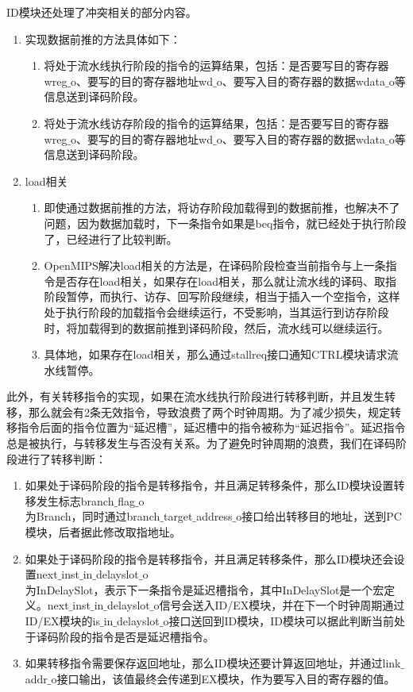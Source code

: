 ID模块还处理了冲突相关的部分内容。
\begin{enumerate}
	\item 实现数据前推的方法具体如下：
	\begin{enumerate}[(1)]
		\item 将处于流水线执行阶段的指令的运算结果，包括：是否要写目的寄存器wreg$\_$o、要写的目的寄存器地址wd$\_$o、要写入目的寄存器的数据wdata$\_$o等信息送到译码阶段。
	
		\item 将处于流水线访存阶段的指令的运算结果，包括：是否要写目的寄存器wreg$\_$o、要写的目的寄存器地址wd$\_$o、要写入目的寄存器的数据wdata$\_$o等信息送到译码阶段。
	\end{enumerate}
	\item load相关
	\begin{enumerate}[(1)]
		\item 即使通过数据前推的方法，将访存阶段加载得到的数据前推，也解决不了问题，因为数据加载时，下一条指令如果是beq指令，就已经处于执行阶段了，已经进行了比较判断。
		
		\item OpenMIPS解决load相关的方法是，在译码阶段检查当前指令与上一条指令是否存在load相关，如果存在load相关，那么就让流水线的译码、取指阶段暂停，而执行、访存、回写阶段继续，相当于插入一个空指令，这样处于执行阶段的加载指令会继续运行，不受影响，当其运行到访存阶段时，将加载得到的数据前推到译码阶段，然后，流水线可以继续运行。
		
		\item 具体地，如果存在load相关，那么通过stallreq接口通知CTRL模块请求流水线暂停。
	\end{enumerate}
\end{enumerate}


此外，有关转移指令的实现，如果在流水线执行阶段进行转移判断，并且发生转移，那么就会有2条无效指令，导致浪费了两个时钟周期。为了减少损失，规定转移指令后面的指令位置为“延迟槽”，延迟槽中的指令被称为“延迟指令”。延迟指令总是被执行，与转移发生与否没有关系。为了避免时钟周期的浪费，我们在译码阶段进行了转移判断：

\begin{enumerate}[(1)]
	\item 如果处于译码阶段的指令是转移指令，并且满足转移条件，那么ID模块设置转移发生标志branch$\_$flag$\_$o\\
	为Branch，同时通过branch$\_$target$\_$address$\_$o接口给出转移目的地址，送到PC模块，后者据此修改取指地址。
	
	\item 如果处于译码阶段的指令是转移指令，并且满足转移条件，那么ID模块还会设置next$\_$inst$\_$in$\_$delayslot$\_$o\\
	为InDelaySlot，表示下一条指令是延迟槽指令，其中InDelaySlot是一个宏定义。next$\_$inst$\_$in$\_$delayslot$\_$o信号会送入ID/EX模块，并在下一个时钟周期通过ID/EX模块的is$\_$in$\_$delayslot$\_$o接口送回到ID模块，ID模块可以据此判断当前处于译码阶段的指令是否是延迟槽指令。
	
	\item 如果转移指令需要保存返回地址，那么ID模块还要计算返回地址，并通过link$\_$addr$\_$o接口输出，该值最终会传递到EX模块，作为要写入目的寄存器的值。
\end{enumerate}

